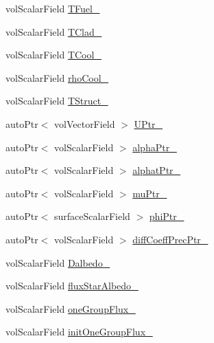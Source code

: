 \begin{DoxyCompactItemize}
\item 
vol\+Scalar\+Field \hyperlink{classFoam_1_1pointKineticNeutronics_a40daf0cf699f5ce2bea8554707d8e11d}{T\+Fuel\+\_\+}
\item 
vol\+Scalar\+Field \hyperlink{classFoam_1_1pointKineticNeutronics_a20ddcf74e7279560e0c7ce78d0319b93}{T\+Clad\+\_\+}
\item 
vol\+Scalar\+Field \hyperlink{classFoam_1_1pointKineticNeutronics_af81c8770211826f576f6d7290a9f8103}{T\+Cool\+\_\+}
\item 
vol\+Scalar\+Field \hyperlink{classFoam_1_1pointKineticNeutronics_af82ea76dc249b3661c882a65cba78a2c}{rho\+Cool\+\_\+}
\item 
vol\+Scalar\+Field \hyperlink{classFoam_1_1pointKineticNeutronics_a3c79fc0d393e1803e82cb5709982dec4}{T\+Struct\+\_\+}
\item 
auto\+Ptr$<$ vol\+Vector\+Field $>$ \hyperlink{classFoam_1_1pointKineticNeutronics_a3f2bd9de379a4b68b01ed2da13922d86}{U\+Ptr\+\_\+}
\item 
auto\+Ptr$<$ vol\+Scalar\+Field $>$ \hyperlink{classFoam_1_1pointKineticNeutronics_abc7c5bd59d290d277926652df30d5325}{alpha\+Ptr\+\_\+}
\item 
auto\+Ptr$<$ vol\+Scalar\+Field $>$ \hyperlink{classFoam_1_1pointKineticNeutronics_ab6fbf6c23c7b0560bebc841cd9a548cf}{alphat\+Ptr\+\_\+}
\item 
auto\+Ptr$<$ vol\+Scalar\+Field $>$ \hyperlink{classFoam_1_1pointKineticNeutronics_a02a6957e64f8ee5582ee4bcd4104b608}{mu\+Ptr\+\_\+}
\item 
auto\+Ptr$<$ surface\+Scalar\+Field $>$ \hyperlink{classFoam_1_1pointKineticNeutronics_a497673767745b44b26977e35496c55df}{phi\+Ptr\+\_\+}
\item 
auto\+Ptr$<$ vol\+Scalar\+Field $>$ \hyperlink{classFoam_1_1pointKineticNeutronics_aa68fdcce7eec7392d06d8be2a783ac8c}{diff\+Coeff\+Prec\+Ptr\+\_\+}
\item 
vol\+Scalar\+Field \hyperlink{classFoam_1_1pointKineticNeutronics_a8994f97eb6a9e12f23364432d1393ff9}{Dalbedo\+\_\+}
\item 
vol\+Scalar\+Field \hyperlink{classFoam_1_1pointKineticNeutronics_a146023caaddac32ce560ab5c8a074908}{flux\+Star\+Albedo\+\_\+}
\item 
vol\+Scalar\+Field \hyperlink{classFoam_1_1pointKineticNeutronics_a05a39571155b6ded783dee3b1e8d5faf}{one\+Group\+Flux\+\_\+}
\item 
vol\+Scalar\+Field \hyperlink{classFoam_1_1pointKineticNeutronics_a1f2985bedbcc3e6223705655521a3491}{init\+One\+Group\+Flux\+\_\+}

\end{DoxyCompactItemize}
